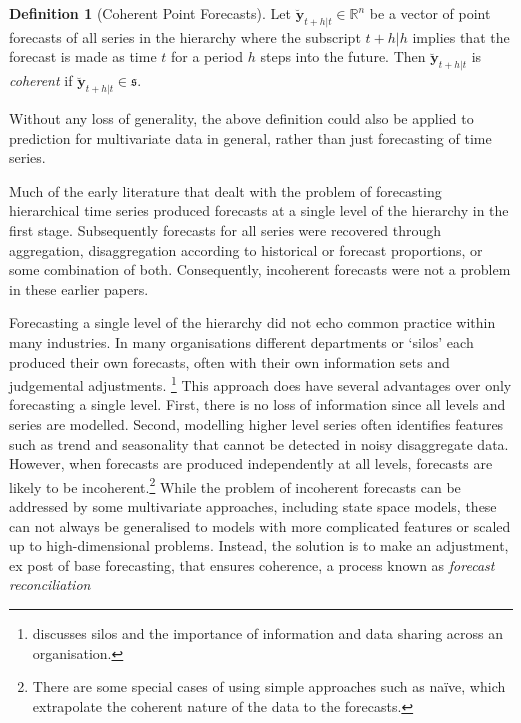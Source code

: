 \documentclass[12pt]{article}
\theoremstyle{definition}
\newtheorem{definition}{Definition}[section]
\begin{document}
\begin{definition}[Coherent Point Forecasts]\label{def:cohpoint}
  Let $\breve{\bm{y}}_{t+h|t} \in \mathbb{R}^n$ be a vector of point forecasts of all series in the hierarchy where the subscript $t+h|h$ implies that the forecast is made as time $t$ for a period $h$ steps into the future. Then $\breve{\bm{y}}_{t+h|t}$ is \emph{coherent} if $\breve{\bm{y}}_{t+h|t} \in \mathfrak{s}$.
\end{definition}

Without any loss of generality, the above definition could also be applied to prediction for multivariate data in general, rather than just forecasting of time series.

Much of the early literature that dealt with the problem of forecasting hierarchical time series \citep[see][and references therein]{Gross1990} produced forecasts at a single level of the hierarchy in the first stage. Subsequently forecasts for all series were recovered through aggregation, disaggregation according to historical or forecast proportions, or some combination of both. Consequently, incoherent forecasts were not a problem in these earlier papers.

Forecasting a single level of the hierarchy did not echo common practice within many industries. In many organisations different departments or `silos' each produced their own forecasts, often with their own information sets and judgemental adjustments. \footnote{\citet{Cha2013} discusses silos and the importance of information and data sharing across an organisation.} This approach does have several advantages over only forecasting a single level. First, there is no loss of information since all levels and series are modelled. Second, modelling higher level series often identifies features such as trend and seasonality that cannot be detected in noisy disaggregate data. However, when forecasts are produced independently at all levels, forecasts are likely to be incoherent.\footnote{There are some special cases of using simple approaches such as na\"{i}ve, which extrapolate the coherent nature of the data to the forecasts.} {\color{blue}While the problem of incoherent forecasts can be addressed by some multivariate approaches, including state space models, these can not always be generalised to models with more complicated features or scaled up to high-dimensional problems.}  Instead, the solution is to make an adjustment, {\color{blue}ex post of base forecasting,} that ensures coherence, a process known as \emph{forecast reconciliation}
\end{document}
